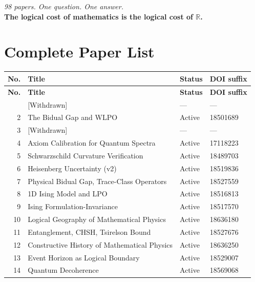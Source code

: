 \documentclass[11pt,twoside,openany]{report}
\theoremstyle{remark}
\begin{document}
\begin{center}
\emph{98 papers. One question. One answer.}\\[4pt]
\textbf{The logical cost of mathematics is the logical cost of $\mathbb{R}$.}
\end{center}


\appendix


\chapter{Complete Paper List}

\begingroup
\setlength{\LTleft}{0pt}
\setlength{\LTright}{0pt}
\small
\begin{longtable}{@{}r p{7.5cm} l l@{}}
\toprule
\textbf{No.} & \textbf{Title} & \textbf{Status} & \textbf{DOI suffix} \\
\midrule
\endfirsthead
\toprule
\textbf{No.} & \textbf{Title} & \textbf{Status} & \textbf{DOI suffix} \\
\midrule
\endhead
\bottomrule
\endfoot
  1 & [Withdrawn] & --- & --- \\
  2 & The Bidual Gap and WLPO & Active & 18501689 \\
  3 & [Withdrawn] & --- & --- \\
  4 & Axiom Calibration for Quantum Spectra & Active & 17118223 \\
  5 & Schwarzschild Curvature Verification & Active & 18489703 \\
  6 & Heisenberg Uncertainty (v2) & Active & 18519836 \\
  7 & Physical Bidual Gap, Trace-Class Operators & Active & 18527559 \\
  8 & 1D Ising Model and LPO & Active & 18516813 \\
  9 & Ising Formulation-Invariance & Active & 18517570 \\
 10 & Logical Geography of Mathematical Physics & Active & 18636180 \\
 11 & Entanglement, CHSH, Tsirelson Bound & Active & 18527676 \\
 12 & Constructive History of Mathematical Physics & Active & 18636250 \\
 13 & Event Horizon as Logical Boundary & Active & 18529007 \\
 14 & Quantum Decoherence & Active & 18569068 \\

\end{longtable}
\end{document}
